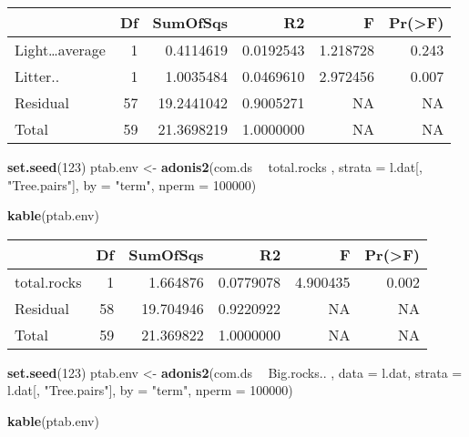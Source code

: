 \documentclass[]{article}
\newenvironment{Shaded}{\begin{snugshade}}{\end{snugshade}}
\newcommand{\KeywordTok}[1]{\textcolor[rgb]{0.13,0.29,0.53}{\textbf{#1}}}
\newcommand{\DataTypeTok}[1]{\textcolor[rgb]{0.13,0.29,0.53}{#1}}
\newcommand{\DecValTok}[1]{\textcolor[rgb]{0.00,0.00,0.81}{#1}}
\newcommand{\StringTok}[1]{\textcolor[rgb]{0.31,0.60,0.02}{#1}}
\newcommand{\OperatorTok}[1]{\textcolor[rgb]{0.81,0.36,0.00}{\textbf{#1}}}
\newcommand{\NormalTok}[1]{#1}
\begin{document}
\begin{longtable}[]{@{}lrrrrr@{}}
\toprule
& Df & SumOfSqs & R2 & F & Pr(\textgreater{}F)\tabularnewline
\midrule
\endhead
Light\ldots{}average & 1 & 0.4114619 & 0.0192543 & 1.218728 &
0.243\tabularnewline
Litter.. & 1 & 1.0035484 & 0.0469610 & 2.972456 & 0.007\tabularnewline
Residual & 57 & 19.2441042 & 0.9005271 & NA & NA\tabularnewline
Total & 59 & 21.3698219 & 1.0000000 & NA & NA\tabularnewline
\bottomrule
\end{longtable}

\begin{Shaded}
\begin{Highlighting}[]
\KeywordTok{set.seed}\NormalTok{(}\DecValTok{123}\NormalTok{)}
\NormalTok{ptab.env <-}\StringTok{ }\KeywordTok{adonis2}\NormalTok{(com.ds }\OperatorTok{~}\StringTok{ }\NormalTok{total.rocks ,}
                   \DataTypeTok{strata =}\NormalTok{ l.dat[, }\StringTok{"Tree.pairs"}\NormalTok{], }
                   \DataTypeTok{by =} \StringTok{"term"}\NormalTok{, }\DataTypeTok{nperm =} \DecValTok{100000}\NormalTok{)}

\KeywordTok{kable}\NormalTok{(ptab.env)}
\end{Highlighting}
\end{Shaded}

\begin{longtable}[]{@{}lrrrrr@{}}
\toprule
& Df & SumOfSqs & R2 & F & Pr(\textgreater{}F)\tabularnewline
\midrule
\endhead
total.rocks & 1 & 1.664876 & 0.0779078 & 4.900435 & 0.002\tabularnewline
Residual & 58 & 19.704946 & 0.9220922 & NA & NA\tabularnewline
Total & 59 & 21.369822 & 1.0000000 & NA & NA\tabularnewline
\bottomrule
\end{longtable}

\begin{Shaded}
\begin{Highlighting}[]
\KeywordTok{set.seed}\NormalTok{(}\DecValTok{123}\NormalTok{)}
\NormalTok{ptab.env <-}\StringTok{ }\KeywordTok{adonis2}\NormalTok{(com.ds }\OperatorTok{~}\StringTok{ }\NormalTok{Big.rocks.. , }\DataTypeTok{data =}\NormalTok{ l.dat, }
                   \DataTypeTok{strata =}\NormalTok{ l.dat[, }\StringTok{"Tree.pairs"}\NormalTok{], }
                   \DataTypeTok{by =} \StringTok{"term"}\NormalTok{, }\DataTypeTok{nperm =} \DecValTok{100000}\NormalTok{)}

\KeywordTok{kable}\NormalTok{(ptab.env)}
\end{Highlighting}
\end{Shaded}
\end{document}

